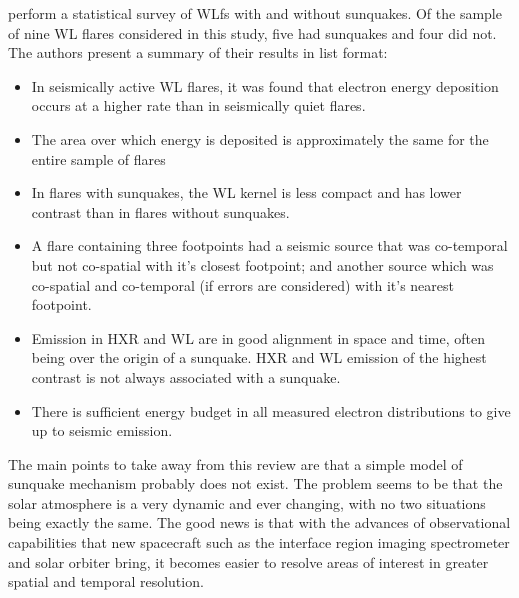 \cite{2012SoPh..277..317P} perform a statistical survey of WLfs with and without sunquakes. Of the sample of nine WL flares considered in this study, five had sunquakes and four did not. The authors present a summary of their results in list format:
\begin{itemize}
\item In seismically active WL flares, it was found that electron energy deposition occurs at a higher rate than in seismically quiet flares.
\item The area over which energy is deposited is approximately the same for the entire sample of flares
\item In flares with sunquakes, the WL kernel is less compact and has lower contrast than in flares without sunquakes.
\item A flare containing three footpoints had a seismic source that was co-temporal but not co-spatial with it's closest footpoint; and another source which was co-spatial and co-temporal (if errors are considered) with it's nearest footpoint.
\item Emission in HXR and WL are in good alignment in space and time, often being over the origin of a sunquake. HXR and WL emission of the highest contrast is not always associated with a sunquake. 
\item There is sufficient energy budget in all measured electron distributions to give up to seismic emission.
\end{itemize}

The main points to take away from this review are that a simple model of sunquake mechanism probably does not exist. The problem seems to be that the solar atmosphere is a very dynamic and ever changing, with no two situations being exactly the same. The good news is that with the advances of observational capabilities that new spacecraft such as the interface region imaging spectrometer and solar orbiter bring, it becomes easier to resolve areas of interest in greater spatial and temporal resolution. \\ \\    




